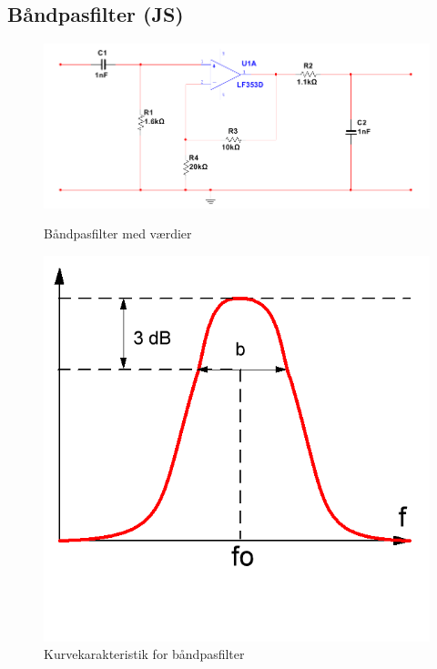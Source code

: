 \newpage

\subsection{Båndpasfilter (JS)}

\begin{figure}[htb]
  \begin{minipage}{0.45\textwidth}
    \centering
      \includegraphics[width=\textwidth]{billeder/HWdesign/BAANDPAS_MV}
      \caption{Båndpasfilter med værdier}
    \label{fig:BAANDPAS_MV}
  \end{minipage}
  \hspace{0.1\textwidth}
  \begin{minipage}{0.45\textwidth}
    \centering
      \includegraphics[width=\textwidth]{billeder/HWdesign/BAANDPAS_KURVE}
      \caption{Kurvekarakteristik for båndpasfilter}
    \label{fig:BAANDPAS_KURVE}
  \end{minipage}
\end{figure}

